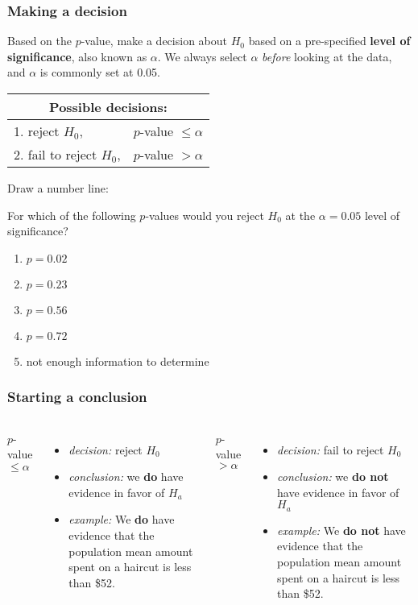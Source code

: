 \begin{frame}
\frametitle{Making a decision}
Based on the $p$-value, make a decision about $H_0$ based on a pre-specified \textbf{level of significance}, also known as $\alpha$.  We always select $\alpha$ \emph{before} looking at the data, and $\alpha$ is commonly set at 0.05.
\begin{center}
\begin{tabular}{ll}
\multicolumn{2}{c}{Possible decisions:}\\
\hline
1. reject $H_0$, & $p$-value $\leq \alpha$ \\
2. fail to reject $H_0$, & $p$-value $> \alpha$ \\
\end{tabular}
\end{center}
\vskip10pt
Draw a number line:
\vskip100pt
\end{frame}

\begin{frame}
\begin{clicker}{For which of the following $p$-values would you reject $H_0$ at the $\alpha=0.05$ level of significance?}
\begin{enumerate}
    \item
    $p=0.02$
    \item
    $p=0.23$
    \item
    $p=0.56$
    \item
    $p=0.72$
    \item
    not enough information to determine
\end{enumerate}
\end{clicker}
\end{frame}


\begin{frame}
\frametitle{Starting a conclusion}
\begin{columns}
$p$-value $\leq \alpha$ 
\begin{itemize}
\item \emph{decision:} reject $H_0$
\item \emph{conclusion:} we \textbf{do} have evidence in favor of $H_a$
\item \emph{example:} We \textbf{do} have evidence that the population mean amount spent on a haircut is less than \$52.
\end{itemize}
$p$-value $>\alpha$
\begin{itemize}
\item \emph{decision:} fail to reject $H_0$
\item \emph{conclusion:} we \textbf{do not} have evidence in favor of $H_a$
\item \emph{example:} We \textbf{do not} have evidence that the population mean amount spent on a haircut is less than \$52.
\end{itemize}
\end{columns}
\end{frame}

